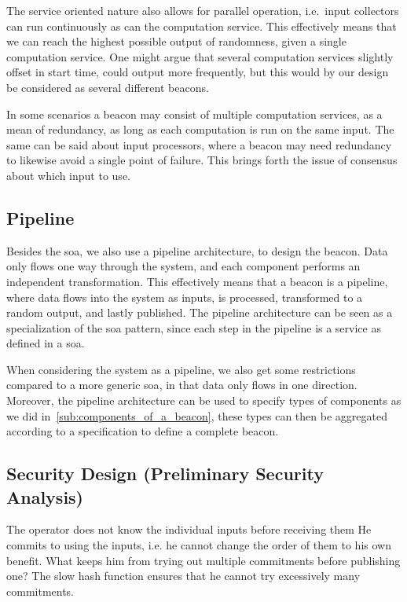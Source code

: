 The service oriented nature also allows for parallel operation, i.e.\ input collectors can run continuously as can the computation service.
This effectively means that we can reach the highest possible output of randomness, given a single computation service.
One might argue that several computation services slightly offset in start time, could output more frequently, but this would by our design be considered as several different beacons.

In some scenarios a beacon may consist of multiple computation services, as a mean of redundancy, as long as each computation is run on the same input.
The same can be said about input processors, where a beacon may need redundancy to likewise avoid a single point of failure.
This brings forth the issue of consensus about which input to use.

\subsection{Pipeline}%
\label{sub:pipeline}
Besides the \gls{soa}, we also use a pipeline architecture, to design the beacon.
Data only flows one way through the system, and each component performs an independent transformation.
This effectively means that a beacon is a pipeline, where data flows into the system as inputs, is processed, transformed to a random output, and lastly published.
The pipeline architecture can be seen as a specialization of the \gls{soa} pattern, since each step in the pipeline is a service as defined in a \gls{soa}.

When considering the system as a pipeline, we also get some restrictions compared to a more generic \gls{soa}, in that data only flows in one direction.
Moreover, the pipeline architecture can be used to specify types of components as we did in~\vref{sub:components_of_a_beacon}, these types can then be aggregated according to a specification to define a complete beacon.

\subsection{Security Design (Preliminary Security Analysis)}


The operator does not know the individual inputs before receiving them
He commits to using the inputs, i.e. he cannot change the order of them to his own benefit. What keeps him from trying out multiple commitments before publishing one?
The slow hash function ensures that he cannot try excessively many commitments.
